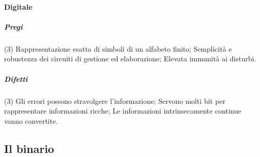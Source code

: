 \documentclass{book}
\begin{document}
\paragraph{Digitale}
\subparagraph{Pregi}
\begin{tasks}(3)
	\task Rappresentazione esatta di simboli di un alfabeto finito;
	\task Semplicità e robustezza dei circuiti di gestione ed elaborazione;
	\task Elevata immunità ai disturbi.
\end{tasks}
\subparagraph{Difetti}
\begin{tasks}(3)
	\task Gli errori possono stravolgere l'informazione;
	\task Servono molti bit per rappresentare informazioni ricche;
	\task Le informazioni intrinsecamente continue vanno convertite.
\end{tasks}
\subsection{Il binario}
\end{document}
